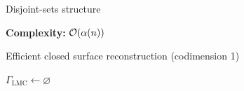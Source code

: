\begin{frame}{Disjoint-sets structure}
\begin{figure}
\begin{subfigure}{0.45\textwidth}
		\end{subfigure}%
	\end{figure}
	\pause
	\textbf{Complexity: } $\mathcal{O}(\alpha(n))$ 
\end{frame}

\begin{frame}[c]{Efficient closed surface reconstruction (codimension 1)}
	\scriptsize
	\begin{minipage}[c]{0.5\linewidth}
		\begin{algorithm}[H]
			
			\alert<0>{$\Gamma_{\operatorname{LMC}} \leftarrow \varnothing$ \\
				 {
			}}
			

\end{algorithm}
\end{minipage}
\end{frame}
